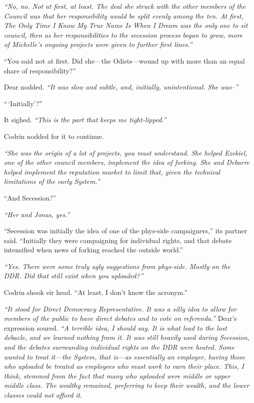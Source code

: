 \emph{``No, no. Not at first, at least. The deal she struck with the other members of the Council was that her responsibility would be split evenly among the ten. At first, The Only Time I Know My True Name Is When I Dream was the only one to sit council, then as her responsibilities to the secession process began to grow, more of Michelle's ongoing projects were given to further first lines.''}

``You said not at first. Did she---the Odists---wound up with more than an equal share of responsibility?''

Dear nodded. \emph{``It was slow and subtle, and, initially, unintentional. She was--''}

``\,`Initially'?''

It sighed. \emph{``This is the part that keeps me tight-lipped.''}

Codrin nodded for it to continue.

\emph{``She was the origin of a lot of projects, you must understand. She helped Ezekiel, one of the other council members, implement the idea of forking. She and Debarre helped implement the reputation market to limit that, given the technical limitations of the early System.''}

``And Secession?''

\emph{``Her and Jonas, yes.''}

``Secession was initially the idea of one of the phys-side campaigners,'' its partner said. ``Initially they were campaigning for individual rights, and that debate intensified when news of forking reached the outside world.''

\emph{``Yes. There were some truly ugly suggestions from phys-side. Mostly on the DDR. Did that still exist when you uploaded?''}

Codrin shook eir head. ``At least, I don't know the acronym.''

\emph{``It stood for Direct Democracy Representative. It was a silly idea to allow for members of the public to have direct debates and to vote on referenda.''} Dear's expression soured. \emph{``A terrible idea, I should say. It is what lead to the lost debacle, and we learned nothing from it. It was still heavily used during Secession, and the debates surrounding individual rights on the DDR were heated. Some wanted to treat it---the System, that is---as essentially an employer, having those who uploaded be treated as employees who must work to earn their place. This, I think, stemmed from the fact that many who uploaded were middle or upper middle class. The wealthy remained, preferring to keep their wealth, and the lower classes could not afford it.}

